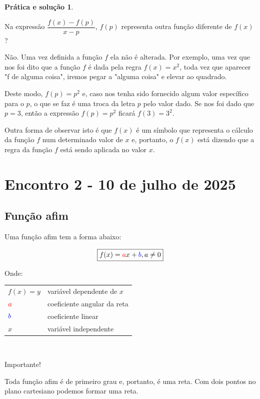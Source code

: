 \documentclass[12pt,openright,twoside,a4paper]{article}
\makeatletter
\theoremstyle{definition}
\newtheorem{practice}{Prática e solução}[section]
\newenvironment{condicoes}[1][Onde:]
{#1 \begin{tabular}[t]{>{$}l<{$} @{${} \implies {}$} l}}
	{\end{tabular}\\[\belowdisplayskip]}
\makeatother
\begin{document}
\begin{practice}
\begin{snugshade}
			Na expressão $\dfrac{f(x) - f(p)}{x - p}$, $f(p)$ representa outra função diferente de $f(x)$?
			
			Não. Uma vez definida a função $f$ ela não é alterada. Por exemplo, uma vez que nos foi dito que a função $f$ é dada pela regra $f(x) = x^2$, toda vez que aparecer "f de alguma coisa", iremos pegar a "alguma coisa" e elevar ao quadrado. 
			
			Deste modo, $f(p) = p^2$ e, caso nos tenha sido fornecido algum valor específico para o $p$, o que se faz é uma troca da letra $p$ pelo valor dado. Se nos foi dado que $p = 3$, então a expressão $f(p) = p^2$ ficará $f(3) = 3^2$.
			
			Outra forma de observar isto é que $f(x)$ é um símbolo que representa o cálculo da função $f$ num determinado valor de $x$ e, portanto, o $f(x)$ está dizendo que a regra da função $f$ está sendo aplicada no valor $x$.
		\end{snugshade}
		
	\end{practice}
	
	\pagebreak
	\section{Encontro 2 - 10 de julho de 2025}
	
	\subsection{Função afim}
	Uma função afim tem a forma abaixo:
	
	\begin{equation}
		\boxed{f(x) = \textcolor{red}{a}x + \textcolor{blue}{b}, a \neq 0}
	\end{equation}
	
	\begin{condicoes}
		f(x)=y & variável dependente de $x$\\
		\textcolor{red}{a} & coeficiente angular da reta\\
		\textcolor{blue}{b} & coeficiente linear\\
		x & variável independente    
	\end{condicoes}
	
	\begin{snugshade}
		{\color{red}Importante!}
		
		Toda função afim é de primeiro grau e, portanto, é uma reta. Com dois pontos no plano cartesiano podemos formar uma reta.
	\end{snugshade}
	
\end{document}
